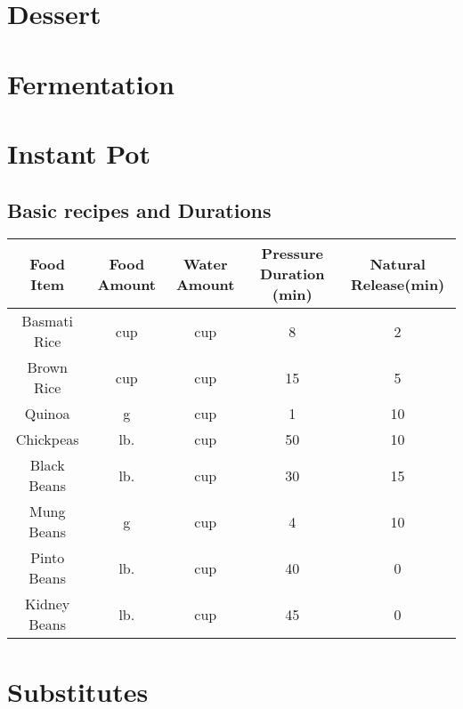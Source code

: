 \documentclass{article}
\begin{document}
\newpage
\section{Dessert}


\newpage


\newpage


\newpage


\newpage


\newpage


\newpage


\newpage


\newpage


\newpage


\newpage
\section{Fermentation}


\section{Instant Pot}
\subsection{Basic recipes and Durations}
\begin{table}[H]
    \centering
    \begin{tabular}{c|c|c|c|c}
        Food Item & Food Amount & Water Amount & Pressure Duration (min) & Natural Release(min) \\ \hline
        Basmati Rice & \unit[1]{cup} & \unit[1]{cup} & 8 & 2\\ \hline
        Brown Rice & \unit[1]{cup} & \unit[1]{cup} & 15 & 5 \\ \hline
        Quinoa & \unit[190]{g} & \unit[1]{cup} & 1 & 10 \\ \hline
        Chickpeas & \unit[1]{lb.} & \unit[6]{cup} & 50 & 10 \\ \hline
        Black Beans & \unit[1]{lb.} & \unit[6]{cup} & 30 & 15 \\ \hline
        Mung Beans & \unit[205]{g} & \unit[3]{cup} & 4 & 10 \\ \hline
	Pinto Beans & \unit[1]{lb.} & \unit[6]{cup} & 40 & 0 \\ \hline
        Kidney Beans & \unit[1]{lb.} & \unit[6]{cup} & 45 & 0 \\ \hline
    \end{tabular}
    \label{tab:InstantPot}
\end{table}

\newpage


\newpage


\newpage


\newpage
\section{Substitutes}


\printindex
\end{document}
